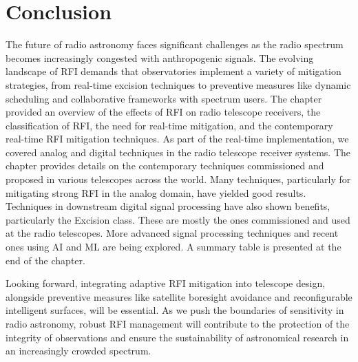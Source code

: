 \section{Conclusion}
\label{section:hardware:conclusion}

The future of radio astronomy faces significant challenges as the radio spectrum becomes increasingly congested with anthropogenic signals. The evolving landscape of RFI demands that observatories implement a variety of mitigation strategies, from real-time excision techniques to preventive measures like dynamic scheduling and collaborative frameworks with spectrum users.
The chapter provided an overview of the effects of RFI on radio telescope receivers, the classification of RFI, the need for real-time mitigation, and the contemporary real-time RFI mitigation techniques. As part of the real-time implementation, we covered analog and digital techniques in the radio telescope receiver systems. The chapter provides details on the contemporary techniques commissioned and proposed in various telescopes across the world. Many techniques, particularly for mitigating strong RFI in the analog domain, have yielded good results. Techniques in downstream digital signal processing have also shown benefits, particularly the Excision class. These are mostly the ones commissioned and used at the radio telescopes. More advanced signal processing techniques and recent ones using AI and ML are being explored. A summary table is presented at the end of the chapter.

Looking forward, integrating adaptive RFI mitigation into telescope design, alongside preventive measures like satellite boresight avoidance and reconfigurable intelligent surfaces, will be essential. As we push the boundaries of sensitivity in radio astronomy, robust RFI management will contribute to the protection of the integrity of observations and ensure the sustainability of astronomical research in an increasingly crowded spectrum.


